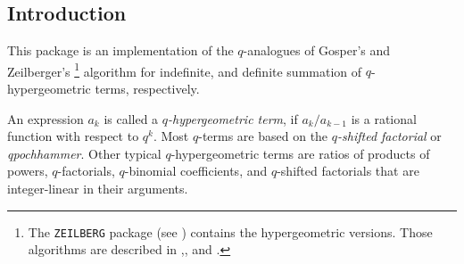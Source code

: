 

\newcommand{\qphihyp}[5]{{}_{#1}\phi_{#2}\left.\left[\begin{array}{c}
	#3 \\ #4 \end{array}\right|q,#5\right]}
\newcommand{\qpsihyp}[5]{{}_{#1}\psi_{#2}\left.\left[\begin{array}{c}
	#3 \\ #4 \end{array}\right|q,#5\right]}
\newcommand{\hyp}[5]{{}_{#1}F_{#2}\left.\left[\begin{array}{c}
	#3 \\ #4 \end{array}\right|#5\right]}

\newcommand{\fcn}[2]{{\mathrm #1}(#2)}
\newcommand{\ifcn}[3]{{\mathrm #1}_{#2}(#3)}
\newcommand{\qfac}[2]{\left(#1;\,q\right)_{#2}}
\newcommand{\qbinomial}[2]{{\binom{#1}{#2}\!}_q}

{\setcounter{redprompt}{0}}
\newcommand{\redprompt}{\stepcounter{redprompt}\theredprompt:}
\newenvironment{redoutput}{\small\begin{alltt}}{\end{alltt}\noindent{}}


\subsection{Introduction}

This package is an implementation of the $q$-analogues of Gosper's
and Zeil\-berger's%
%
\footnote{The \texttt{ZEILBERG} package (see \cite{Koepf2})
contains the hypergeometric versions. Those algorithms are described in 
\cite{Gosper},\cite{hyper_Zeilberger1},\cite{hyper_Zeilberger2}
and \cite{Koepf1}.}
%
algorithm for indefinite, and definite summation of
$q$-hypergeo\-metric terms, respectively.

An expression $a_k$ is called a {\sl $q$-hypergeometric term}, if
$a_{k}/a_{k-1}$ is a rational function with respect to $q^k$. Most
$q$-terms are based on the {\sl $q$-shifted factorial} or 
{\sl qpochhammer}. Other typical $q$-hypergeometric terms are ratios 
of products of powers, $q$-factorials, $q$-binomial coefficients, and 
$q$-shifted factorials that are integer-linear in their arguments.


